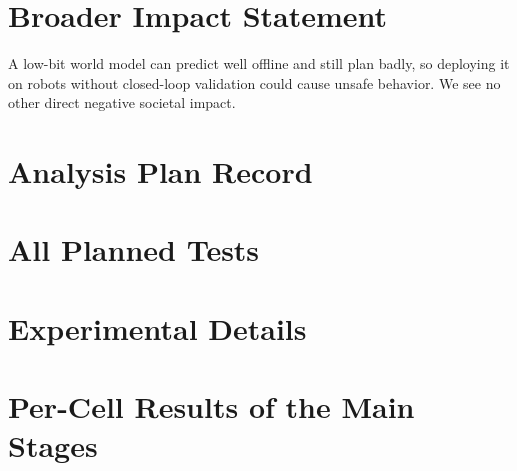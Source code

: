 \documentclass[10pt]{article}
\begin{document}
\section*{Broader Impact Statement}
A low-bit world model can predict well offline and still plan badly, so deploying it on robots without closed-loop validation could cause unsafe behavior. We see no other direct negative societal impact.

\clearpage



\clearpage
\appendix

\FloatBarrier
\section{Analysis Plan Record}
\label{app:plan}


\FloatBarrier
\section{All Planned Tests}
\label{app:tests}


\FloatBarrier
\section{Experimental Details}
\label{app:details}


\FloatBarrier
\section{Per-Cell Results of the Main Stages}
\label{app:cells}

\end{document}
